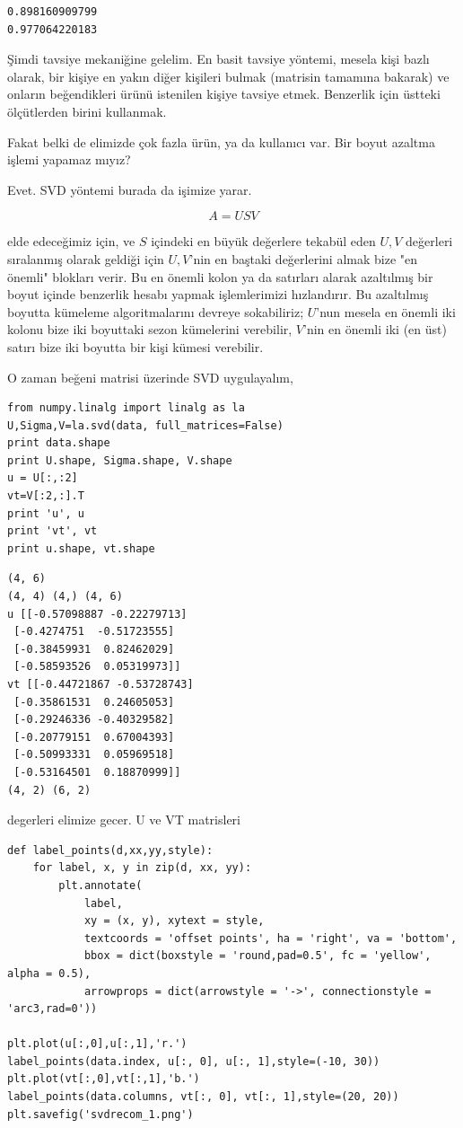 \documentclass[12pt,fleqn]{article}\usepackage{../../common}
\begin{document}
\begin{verbatim}
0.898160909799
0.977064220183
\end{verbatim}

Şimdi tavsiye mekaniğine gelelim. En basit tavsiye yöntemi, mesela
kişi bazlı olarak, bir kişiye en yakın diğer kişileri bulmak (matrisin
tamamına bakarak) ve onların beğendikleri ürünü istenilen kişiye
tavsiye etmek. Benzerlik için üstteki ölçütlerden birini kullanmak.

Fakat belki de elimizde çok fazla ürün, ya da kullanıcı var. Bir boyut
azaltma işlemi yapamaz mıyız?

Evet. SVD yöntemi burada da işimize yarar. 

$$ A = USV  $$

elde edeceğimiz için, ve $S$ içindeki en büyük değerlere tekabül eden
$U,V$ değerleri sıralanmış olarak geldiği için $U,V$'nin en baştaki
değerlerini almak bize "en önemli" blokları verir. Bu en önemli kolon
ya da satırları alarak azaltılmış bir boyut içinde benzerlik hesabı
yapmak işlemlerimizi hızlandırır. Bu azaltılmış boyutta kümeleme
algoritmalarını devreye sokabiliriz; $U$'nun mesela en önemli iki
kolonu bize iki boyuttaki sezon kümelerini verebilir, $V$'nin en
önemli iki (en üst) satırı bize iki boyutta bir kişi kümesi verebilir.

O zaman beğeni matrisi üzerinde SVD uygulayalım,

\begin{verbatim}
from numpy.linalg import linalg as la
U,Sigma,V=la.svd(data, full_matrices=False)
print data.shape
print U.shape, Sigma.shape, V.shape
u = U[:,:2]
vt=V[:2,:].T
print 'u', u
print 'vt', vt
print u.shape, vt.shape
\end{verbatim}

\begin{verbatim}
(4, 6)
(4, 4) (4,) (4, 6)
u [[-0.57098887 -0.22279713]
 [-0.4274751  -0.51723555]
 [-0.38459931  0.82462029]
 [-0.58593526  0.05319973]]
vt [[-0.44721867 -0.53728743]
 [-0.35861531  0.24605053]
 [-0.29246336 -0.40329582]
 [-0.20779151  0.67004393]
 [-0.50993331  0.05969518]
 [-0.53164501  0.18870999]]
(4, 2) (6, 2)
\end{verbatim}

degerleri elimize gecer. U ve VT matrisleri 

\begin{verbatim}
def label_points(d,xx,yy,style):
    for label, x, y in zip(d, xx, yy):
        plt.annotate(
            label, 
            xy = (x, y), xytext = style,
            textcoords = 'offset points', ha = 'right', va = 'bottom',
            bbox = dict(boxstyle = 'round,pad=0.5', fc = 'yellow', alpha = 0.5),
            arrowprops = dict(arrowstyle = '->', connectionstyle = 'arc3,rad=0'))

plt.plot(u[:,0],u[:,1],'r.')
label_points(data.index, u[:, 0], u[:, 1],style=(-10, 30))
plt.plot(vt[:,0],vt[:,1],'b.')
label_points(data.columns, vt[:, 0], vt[:, 1],style=(20, 20))
plt.savefig('svdrecom_1.png')
\end{verbatim}
\end{document}
